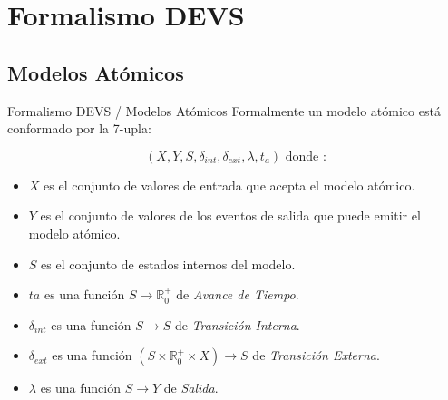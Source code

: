 \documentclass{beamer}
\begin{document}
\section{Formalismo DEVS}
\subsection{Modelos Atómicos}
\begin{frame}{Formalismo DEVS / Modelos Atómicos}
	Formalmente un modelo atómico está conformado por la 7-upla:

	\begin{equation} 
	(X, Y, S, \delta_{int} , \delta_{ext}, \lambda, t_{a}) \mbox{ donde :}
	\end{equation}

	\begin{itemize}
	\item<1-> $X$ es el conjunto de valores de entrada que acepta el modelo atómico.
	\item<2-> $Y$ es el conjunto de valores de los eventos de salida que puede emitir el modelo atómico.
	\item<3-> $S$ es el conjunto de estados internos del modelo.
	\item<4-> $ta$ es una función $S \to \mathbb{R}^{+}_{0}$ de \emph{Avance de Tiempo}.
	\item<5-> $\delta_{int}$ es una función $S \to S$ de \emph{Transición Interna}.
	\item<6-> $\delta_{ext}$ es una función $(S \times \mathbb{R}^{+}_{0} \times X) \to S$ de \emph{Transición Externa}.
	\item<7-> $\lambda$ es una función $S \to Y$ de \emph{Salida}.
	\end{itemize}
\end{frame}

\end{document}
